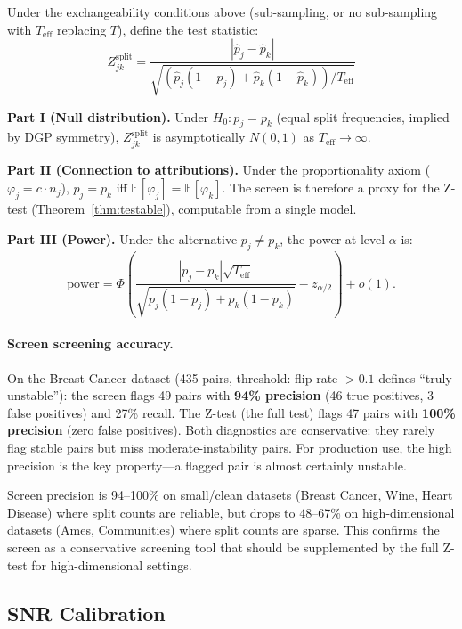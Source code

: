 \documentclass{jmlr}
\newcommand{\E}{\mathbb{E}}
\begin{document}
\begin{theorem}
\label{thm:split-diagnostic}
Under the exchangeability conditions above (sub-sampling, or no sub-sampling with $T_{\text{eff}}$ replacing $T$), define the test statistic:
\[
    Z^{\text{split}}_{jk} = \frac{|\hat{p}_j - \hat{p}_k|}{\sqrt{(\hat{p}_j(1-\hat{p}_j) + \hat{p}_k(1-\hat{p}_k))/T_{\text{eff}}}}
\]

\textbf{Part I (Null distribution).} Under $H_0: p_j = p_k$ (equal split frequencies, implied by DGP symmetry), $Z^{\text{split}}_{jk}$ is asymptotically $N(0,1)$ as $T_{\text{eff}} \to \infty$.

\textbf{Part II (Connection to attributions).} Under the proportionality axiom ($\varphi_j = c \cdot n_j$), $p_j = p_k$ iff $\E[\varphi_j] = \E[\varphi_k]$. The screen is therefore a proxy for the Z-test (Theorem~\ref{thm:testable}), computable from a single model.

\textbf{Part III (Power).} Under the alternative $p_j \neq p_k$, the power at level $\alpha$ is:
\[
    \text{power} = \Phi\!\left(\frac{|p_j - p_k|\sqrt{T_{\text{eff}}}}{\sqrt{p_j(1-p_j) + p_k(1-p_k)}} - z_{\alpha/2}\right) + o(1).
\]
\end{theorem}

\paragraph{Screen screening accuracy.}
On the Breast Cancer dataset (435 pairs, threshold: flip rate $> 0.1$ defines ``truly unstable''): the screen flags 49 pairs with \textbf{94\% precision} (46 true positives, 3 false positives) and 27\% recall. The Z-test (the full test) flags 47 pairs with \textbf{100\% precision} (zero false positives). Both diagnostics are conservative: they rarely flag stable pairs but miss moderate-instability pairs. For production use, the high precision is the key property---a flagged pair is almost certainly unstable.

Screen precision is 94--100\% on small/clean datasets (Breast Cancer, Wine, Heart Disease) where split counts are reliable, but drops to 48--67\% on high-dimensional datasets (Ames, Communities) where split counts are sparse. This confirms the screen as a conservative screening tool that should be supplemented by the full Z-test for high-dimensional settings.

\subsection{SNR Calibration}
\label{sec:snr}
\end{document}
